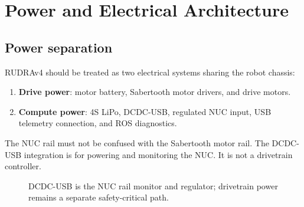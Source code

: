\chapter{Power and Electrical Architecture}

\section{Power separation}

RUDRAv4 should be treated as two electrical systems sharing the robot chassis:

\begin{enumerate}
  \item \textbf{Drive power}: motor battery, Sabertooth motor drivers, and drive motors.
  \item \textbf{Compute power}: 4S LiPo, DCDC-USB, regulated NUC input, USB telemetry connection, and ROS diagnostics.
\end{enumerate}

The NUC rail must not be confused with the Sabertooth motor rail. The DCDC-USB integration is for powering and monitoring the NUC. It is not a drivetrain controller.

\begin{figure}[htbp]
\centering
{}
\caption{DCDC-USB is the NUC rail monitor and regulator; drivetrain power remains a separate safety-critical path.}
\end{figure}

